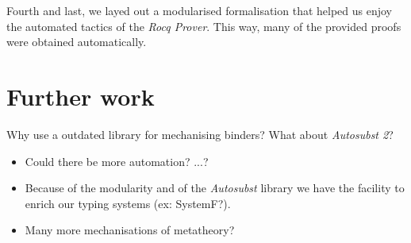 Fourth and last, we layed out a modularised formalisation that helped us enjoy the automated tactics of the \textit{Rocq Prover}.
This way, many of the provided proofs were obtained automatically.

\section{Further work}

Why use a outdated library for mechanising binders? What about \textit{Autosubst 2}?

\begin{itemize}
\item Could there be more automation? ...?
\item Because of the modularity and of the \textit{Autosubst} library we have the facility to enrich our typing systems (ex: SystemF?).
\item Many more mechanisations of metatheory?
\end{itemize}

\begin{comment}
Mechanisations in relation with the formalisations on the paper.
\begin{itemize}
\item Some ideas for the metatheory formalised come from attempts of mechanisations.
\item The metatheory mechanised does not correspond exactly to the formalised in the literature.
  \subitem An example: the polymorphic definition for system  $\LamM$.
\end{itemize}

Further work?
\begin{itemize}
\item Because of the modularity and of the \textit{Autosubst} library we have the facility to enrich our typing systems (ex: SystemF?).
\item Could there be more automation?  
\item Why use a outdated library for mechanising binders? What about \textit{Autosubst 2}?
\item Obstacles on the mechanisation of a non standard substitution operation.
\item SSreflect style proofs for \textit{Rocq Prover}.
\end{itemize}
\end{comment}

